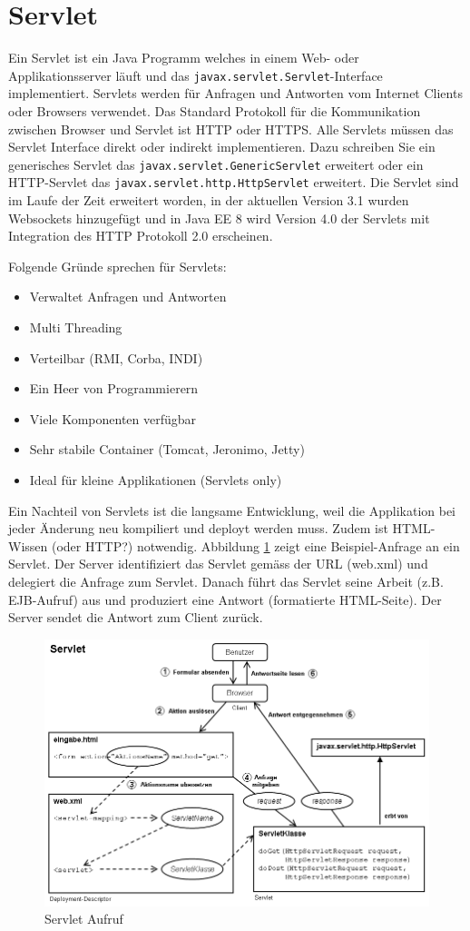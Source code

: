 \section{Servlet}

Ein Servlet ist ein Java Programm welches in einem Web- oder Applikationsserver läuft und das \verb|javax.servlet.Servlet|-Interface implementiert. Servlets werden für Anfragen und Antworten vom Internet Clients oder Browsers verwendet. Das Standard Protokoll für die Kommunikation zwischen Browser und Servlet ist HTTP oder HTTPS. Alle Servlets müssen das Servlet Interface direkt oder indirekt implementieren. Dazu schreiben Sie ein generisches Servlet das
\verb|javax.servlet.GenericServlet| erweitert oder ein HTTP-Servlet das \verb|javax.servlet.http.HttpServlet| erweitert. Die Servlet sind im Laufe der Zeit erweitert worden, in der aktuellen Version 3.1 wurden Websockets hinzugefügt und in Java EE 8 wird Version 4.0 der Servlets mit Integration des HTTP Protokoll 2.0 erscheinen.

Folgende Gründe sprechen für Servlets:

\begin{itemize}
	\item Verwaltet Anfragen und Antworten
	\item Multi Threading
	\item Verteilbar (RMI, Corba, INDI)
	\item Ein Heer von Programmierern
	\item Viele Komponenten verfügbar
	\item Sehr stabile Container (Tomcat, Jeronimo, Jetty)
	\item Ideal für kleine Applikationen (Servlets only)
\end{itemize}

Ein Nachteil von Servlets ist die langsame Entwicklung, weil die Applikation bei jeder Änderung neu kompiliert und deployt werden muss. Zudem ist HTML-Wissen (oder HTTP?) notwendig. Abbildung \ref{fig:servlet-aufruf} zeigt eine Beispiel-Anfrage an ein Servlet. Der Server identifiziert das Servlet gemäss der URL (web.xml) und delegiert die Anfrage zum Servlet. Danach führt das Servlet seine Arbeit (z.B. EJB-Aufruf) aus und produziert eine Antwort (formatierte HTML-Seite). Der Server sendet die Antwort zum Client zurück.

\begin{figure}
\centering
\includegraphics[width=0.5\linewidth]{fig/servlet-aufruf}
\caption{Servlet Aufruf}
\label{fig:servlet-aufruf}
\end{figure}

